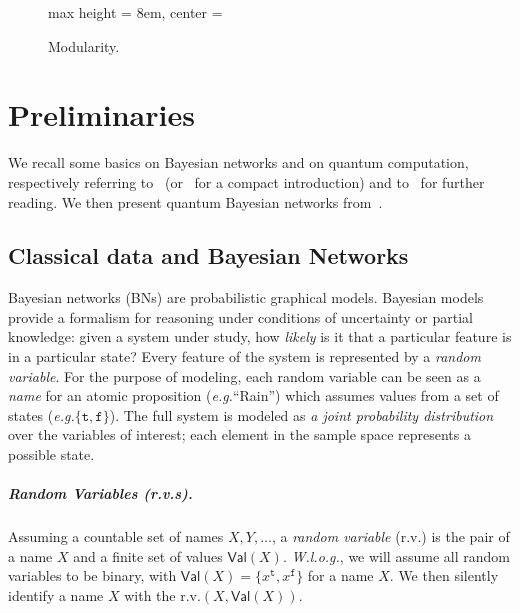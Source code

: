 \documentclass[10pt,a4paper]{article}
\newcommand*{\eg}{\emph{e.g.}\xspace}
\newcommand{\true}{\mathtt{t}}
\newcommand{\false}{\mathtt{f}}
\newcommand{\Val}[1]{\mathsf{Val}(#1)}
\newcommand{\rv}{r.v.\xspace}
\newcommand{\rvs}{r.v.s\xspace}
\begin{document}
\begin{figure}
\begin{minipage}[b]{0.6\linewidth}
\begin{adjustbox}{max height = 8em, center = \linewidth}
\end{adjustbox}
\caption{Modularity.}
\label{fig:modular}
\end{minipage}
\end{figure}


\section{Preliminaries}
\label{sec:background}

We recall some basics on Bayesian networks and on quantum computation, respectively referring to~\cite{DarwicheBook} (or~\cite{DarwicheHandbook} for a compact introduction) and to~\cite{Nielsen_book,Watrous_book} for further reading.
We then present quantum Bayesian networks from~\cite{GBN2014}.

\subsection{Classical data and Bayesian Networks}
\label{sec:BN}

Bayesian networks (BNs) are probabilistic graphical models.
Bayesian models provide a formalism for reasoning under conditions of uncertainty or partial knowledge: given a system under study, how \emph{likely} is it that a particular feature is in a particular state?
Every feature of the system is represented by a \emph{random variable}.
For the purpose of modeling, each random variable can be seen as a \emph{name} for an atomic proposition (\eg ``Rain'') which assumes values from a set of states (\eg $\{\true,\false\}$).
The full system is modeled as \emph{a joint probability distribution} over the variables of interest; each element in the sample space represents a possible state.

\subparagraph{Random Variables (\rvs).}

Assuming a countable set of names $X,Y,\dots$, a \emph{random variable} (\rv) is the pair of a name $X$ and a finite set of values $\Val X$.
\emph{W.l.o.g.}, we will assume all random variables to be binary, with $\Val{X}=\{x^\true,x^\false\}$ for a name $X$.
We then silently identify a name $X$ with the \rv $(X, \Val X)$.
\end{document}
